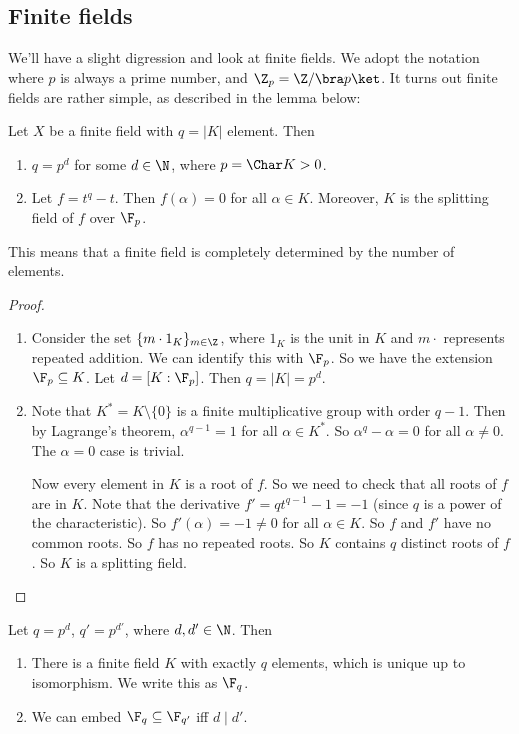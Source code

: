 \documentclass[a4paper]{article}
\begin{document}
\subsection{Finite fields}
We'll have a slight digression and look at finite fields. We adopt the notation where $p$ is always a prime number, and $\Z_p =\Z/\bra p\ket$. It turns out finite fields are rather simple, as described in the lemma below:

\begin{lemma}
  Let $X$ be a finite field with $q = |K|$ element. Then
  \begin{enumerate}
    \item $q = p^d$ for some $d \in \N$, where $p = \Char K > 0$.
    \item Let $f = t^q - t$. Then $f(\alpha) = 0$ for all $\alpha \in K$. Moreover, $K$ is the splitting field of $f$ over $\F_p$.
  \end{enumerate}
\end{lemma}
This means that a finite field is completely determined by the number of elements.

\begin{proof}\leavevmode
  \begin{enumerate}
    \item Consider the set $\{m \cdot 1_K\}_{m \in \Z}$, where $1_K$ is the unit in $K$ and $m\cdot$ represents repeated addition. We can identify this with $\F_p$. So we have the extension $\F_p \subseteq K$. Let $d = [K: \F_p]$. Then $q = |K| = p^d$.

    \item Note that $K^* = K\setminus \{0\}$ is a finite multiplicative group with order $q - 1$. Then by Lagrange's theorem, $\alpha^{q - 1} = 1$ for all $\alpha\in K^*$. So $\alpha^q - \alpha = 0$ for all $\alpha \not= 0$. The $\alpha = 0$ case is trivial.

      Now every element in $K$ is a root of $f$. So we need to check that all roots of $f$ are in $K$. Note that the derivative $f' = qt^{q - 1} - 1 = -1$ (since $q$ is a power of the characteristic). So $f'(\alpha) = -1 \not= 0$ for all $\alpha \in K$. So $f$ and $f'$ have no common roots. So $f$ has no repeated roots. So $K$ contains $q$ distinct roots of $f$. So $K$ is a splitting field.
  \end{enumerate}
\end{proof}

\begin{lemma}
  Let $q = p^d$, $q' = p^{d'}$, where $d, d' \in \N$. Then
  \begin{enumerate}
    \item There is a finite field $K$ with exactly $q$ elements, which is unique up to isomorphism. We write this as $\F_q$.
    \item We can embed $\F_q \subseteq \F_{q'}$ iff $d \mid d'$.
  \end{enumerate}
\end{lemma}
\end{document}
